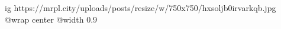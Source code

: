 
 
 
 
 

\ifcmt
  ig https://mrpl.city/uploads/posts/resize/w/750x750/hxsoljb0irvarkqb.jpg
  @wrap center
  @width 0.9
\fi
